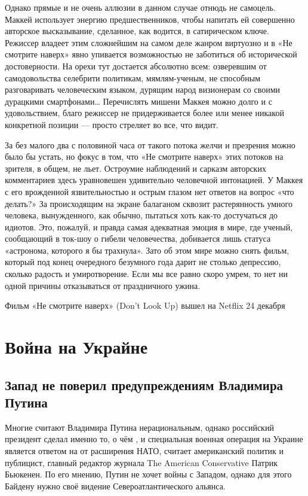 Однако прямые и не очень аллюзии в данном случае отнюдь не самоцель. Маккей использует энергию предшественников, чтобы напитать ей совершенно авторское высказывание, сделанное, как водится, в сатирическом ключе. Режиссер владеет этим сложнейшим на самом деле жанром виртуозно и в «Не смотрите наверх» явно упивается возможностью не заботиться об исторической достоверности. На орехи тут достается абсолютно всем: озверевшим от самодовольства селебрити политикам, мямлям-ученым, не способным разговаривать человеческим языком, дурящим народ визионерам со своими дурацкими смартфонами… Перечислять мишени Маккея можно долго и с удовольствием, благо режиссер не придерживается более или менее никакой конкретной позиции — просто стреляет во все, что видит.

За без малого два с половиной часа от такого потока желчи и презрения можно было бы устать, но фокус в том, что «Не смотрите наверх» этих потоков на зрителя, в общем, не льет. Остроумие наблюдений и сарказм авторских комментариев здесь уравновешен удивительно человечной интонацией. У Маккея с его врожденной язвительностью и острым глазом нет ответов на вопрос «что делать?» За происходящим на экране балаганом сквозит растерянность умного человека, вынужденного, как обычно, пытаться хоть как-то достучаться до идиотов. Это, пожалуй, и правда самая адекватная эмоция в мире, где ученый, сообщающий в ток-шоу о гибели человечества, добивается лишь статуса «астронома, которого я бы трахнула». Зато об этом мире можно снять фильм, который под конец очередного безумного года дарит не столько депрессию, сколько радость и умиротворение. Если мы все равно скоро умрем, то нет ни одной причины отказываться от праздничного ужина.

Фильм «Не смотрите наверх» (Don't Look Up) вышел на Netflix 24 декабря



\section{Война на Украйне}
\subsection{Запад не поверил предупреждениям Владимира Путина}

Многие считают Владимира Путина нерациональным, однако российский президент сделал именно то, о чём , и специальная военная операция на Украине является ответом на  от расширения НАТО, считает американский политик и публицист, главный редактор журнала The American Conservative Патрик Бьюкенен. По его мнению, Путин не хочет войны с Западом, однако для этого Байдену нужно  своё видение Североатлантического альянса.

